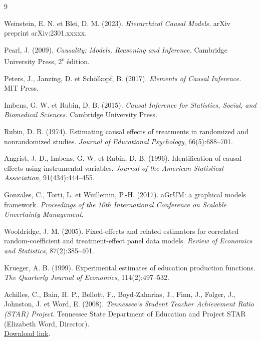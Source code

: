 \documentclass[11pt,a4paper]{article}
\begin{document}
\begin{thebibliography}{9}

Weinstein, E. N. et Blei, D. M. (2023).
\textit{Hierarchical Causal Models.}
arXiv preprint arXiv:2301.xxxxx.

Pearl, J. (2009).
\textit{Causality: Models, Reasoning and Inference.}
Cambridge University Press, 2\textsuperscript{e} édition.

Peters, J., Janzing, D. et Sch{\"o}lkopf, B. (2017).
\textit{Elements of Causal Inference.}
MIT Press.

Imbens, G. W. et Rubin, D. B. (2015).
\textit{Causal Inference for Statistics, Social, and Biomedical Sciences.}
Cambridge University Press.

Rubin, D. B. (1974).
Estimating causal effects of treatments in randomized and nonrandomized studies.
\textit{Journal of Educational Psychology}, 66(5):688--701.

Angrist, J. D., Imbens, G. W. et Rubin, D. B. (1996).
Identification of causal effects using instrumental variables.
\textit{Journal of the American Statistical Association}, 91(434):444--455.

Gonzales, C., Torti, L. et Wuillemin, P.-H. (2017).
aGrUM: a graphical models framework.
\textit{Proceedings of the 10th International Conference on Scalable Uncertainty Management}.

Wooldridge, J. M. (2005).
Fixed-effects and related estimators for correlated random-coefficient and treatment-effect panel data models.
\textit{Review of Economics and Statistics}, 87(2):385--401.

Krueger, A. B. (1999).
Experimental estimates of education production functions.
\textit{The Quarterly Journal of Economics}, 114(2):497--532.

Achilles, C., Bain, H. P., Bellott, F., Boyd-Zaharias, J., Finn, J., Folger, J., Johnston, J. et Word, E. (2008).
\textit{Tennessee's Student Teacher Achievement Ratio (STAR) Project.}
Tennessee State Department of Education and Project STAR (Elizabeth Word, Director).\\
\href{https://www.classsizematters.org/wp-content/uploads/2016/09/STAR-Technical-Report-Part-I.pdf}{Download link}.


\end{thebibliography}
\end{document}
